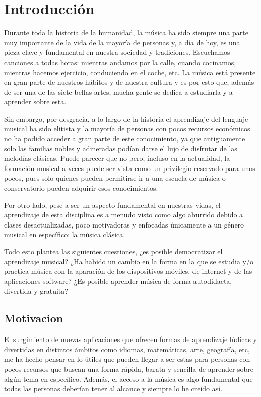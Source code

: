 \chapter{Introducción}


Durante toda la historia de la humanidad, la música ha sido siempre una parte muy importante de la vida de la mayoría de personas y, a día de hoy, es una pieza clave
 y fundamental en nuestra sociedad y tradiciones. Escuchamos canciones a todas horas: mientras andamos por la calle, 
 cuando cocinamos, mientras hacemos ejercicio, conduciendo en el coche, etc. La música está presente en gran
parte de nuestros hábitos y de nuestra cultura y es por esto que, además de ser una de las siete
 bellas artes, mucha gente se dedica a estudiarla y a aprender sobre esta.

Sin embargo, por desgracia, a lo largo de la historia el aprendizaje del lenguaje musical ha sido elitista y la mayoría
de personas con pocos recursos económicos no ha podido acceder a gran parte de este conocimiento, ya que antiguamente solo
las familias nobles y adineradas podían darse el lujo de disfrutar de las melodías clásicas. Puede parecer que no pero, incluso en la actualidad,
 la formación musical a veces puede ser vista como un privilegio reservado para unos pocos, pues solo
quienes pueden permitirse ir a una escuela de música o conservatorio pueden adquirir esos conocimientos.

Por otro lado, pese a ser un aspecto fundamental en nuestras vidas, el aprendizaje de esta disciplina es a menudo visto como algo aburrido debido a
clases desactualizadas, poco motivadoras y enfocadas únicamente a un género musical en específico: la música clásica.

\newpage
Todo esto plantea las siguientes cuestiones, ¿es posible democratizar el aprendizaje musical? ¿Ha habido un cambio en la forma en la que se estudia y/o practica música
con la aparación de los dispositivos móviles, de internet y de las aplicaciones software? ¿Es posible aprender música de forma autodidacta, divertida y
gratuita?  

\section{Motivacion}
El surgimiento de nuevas aplicaciones que ofrecen formas de aprendizaje lúdicas y divertidas en distintos ámbitos como idiomas, matemáticas, arte, geografía, etc, 
me ha hecho pensar en lo útiles que pueden llegar a ser estas para personas con pocos recursos que buscan una forma rápida, barata y sencilla de aprender sobre
algún tema en específico. Además, el acceso a la música es algo fundamental que todas las personas deberían tener al alcance y siempre lo he creído así. 

